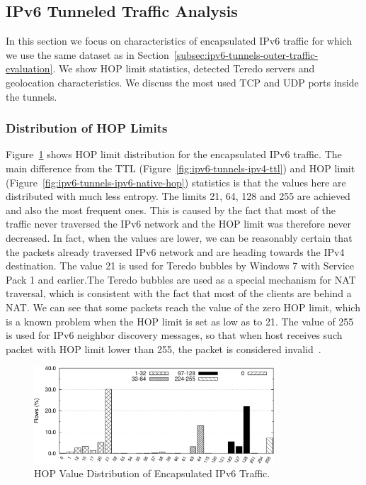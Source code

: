 \subsection{IPv6 Tunneled Traffic Analysis} \label{subsec:ipv6-tunnels-inner-traffic-evaluation}

In this section we focus on characteristics of encapsulated IPv6 traffic for which we use the same dataset as in Section~\ref{subsec:ipv6-tunnels-outer-traffic-evaluation}. We show HOP limit statistics, detected Teredo servers and geolocation characteristics. We discuss the most used TCP and UDP ports inside the tunnels.

\subsubsection{Distribution of HOP Limits}
Figure~\ref{fig:ipv6-tunnels-tunnels-hop} shows HOP limit distribution for the encapsulated IPv6 traffic. The main difference from the TTL (Figure~\ref{fig:ipv6-tunnels-ipv4-ttl}) and HOP limit (Figure~\ref{fig:ipv6-tunnels-ipv6-native-hop}) statistics is that the values here are distributed with much less entropy. The limits 21, 64, 128 and 255 are achieved and also the most frequent ones. This is caused by the fact that most of the traffic never traversed the IPv6 network and the HOP limit was therefore never decreased. In fact, when the values are lower, we can be reasonably certain that the packets already traversed IPv6 network and are heading towards the IPv4 destination. The value 21 is used for Teredo bubbles by Windows 7 with Service Pack 1 and earlier.The Teredo bubbles are used as a special mechanism for NAT traversal, which is consistent with the fact that most of the clients are behind a NAT. We can see that some packets reach the value of the zero HOP limit, which is a known problem when the HOP limit is set as low as to 21. The value of 255 is used for IPv6 neighbor discovery messages, so that when host receives such packet with HOP limit lower than 255, the packet is considered invalid~\cite{rfc4861}.

\begin{figure}[!tb]
        \centering
        \includegraphics[width=0.8\textwidth]{figures/paper-tunnels/ttl/hop}
        \caption{HOP Value Distribution of Encapsulated IPv6 Traffic.}
        \label{fig:ipv6-tunnels-tunnels-hop}
\end{figure}


